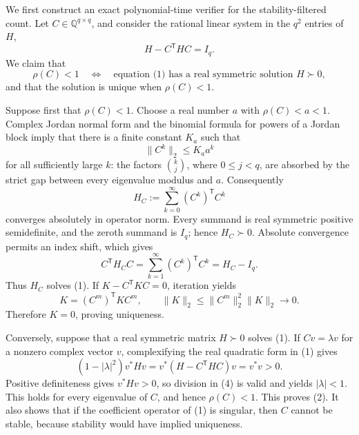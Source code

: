 We first construct an exact polynomial-time verifier for the stability-filtered count. Let \(C\in\mathbb Q^{q\times q}\), and consider the rational linear system in the \(q^2\) entries of \(H\),
\[
 H-C^{\mathsf T}HC=I_q. \tag{1}
\]
We claim that
\[
 \rho(C)<1
 \quad\Longleftrightarrow\quad
 \text{equation (1) has a real symmetric solution \(H\succ0\)}, \tag{2}
\]
and that the solution is unique when \(\rho(C)<1\).

Suppose first that \(\rho(C)<1\). Choose a real number \(a\) with \(\rho(C)<a<1\). Complex Jordan normal form and the binomial formula for powers of a Jordan block imply that there is a finite constant \(K_a\) such that
\[
 \lVert C^k\rVert_2\leq K_a a^k
\]
for all sufficiently large \(k\): the factors \(\binom{k}{j}\), where \(0\leq j<q\), are absorbed by the strict gap between every eigenvalue modulus and \(a\). Consequently
\[
 H_C:=\sum_{k=0}^{\infty}(C^k)^{\mathsf T}C^k \tag{3}
\]
converges absolutely in operator norm. Every summand is real symmetric positive semidefinite, and the zeroth summand is \(I_q\); hence \(H_C\succ0\). Absolute convergence permits an index shift, which gives
\[
 C^{\mathsf T}H_CC
 =\sum_{k=1}^{\infty}(C^k)^{\mathsf T}C^k
 =H_C-I_q.
\]
Thus \(H_C\) solves (1). If \(K-C^{\mathsf T}KC=0\), iteration yields
\[
 K=(C^m)^{\mathsf T}KC^m,
 \qquad
 \lVert K\rVert_2
 \leq \lVert C^m\rVert_2^2\lVert K\rVert_2
 \longrightarrow0.
\]
Therefore \(K=0\), proving uniqueness.

Conversely, suppose that a real symmetric matrix \(H\succ0\) solves (1). If \(Cv=\lambda v\) for a nonzero complex vector \(v\), complexifying the real quadratic form in (1) gives
\[
 (1-|\lambda|^2)v^*Hv
 =v^*(H-C^{\mathsf T}HC)v
 =v^*v>0. \tag{4}
\]
Positive definiteness gives \(v^*Hv>0\), so division in (4) is valid and yields \(|\lambda|<1\). This holds for every eigenvalue of \(C\), and hence \(\rho(C)<1\). This proves (2). It also shows that if the coefficient operator of (1) is singular, then \(C\) cannot be stable, because stability would have implied uniqueness.

